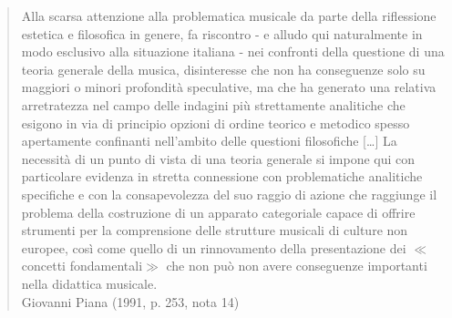 \begin{multicols}{2}
\begin{quote}
	Alla scarsa attenzione alla problematica musicale da parte della riflessione estetica e filosofica in genere, fa riscontro - e alludo qui naturalmente in modo esclusivo alla situazione italiana - nei confronti della questione di una teoria generale della musica, disinteresse che non ha conseguenze solo su maggiori o minori profondità speculative, ma che ha generato una relativa arretratezza nel campo delle indagini più strettamente analitiche che esigono in via di principio opzioni di ordine teorico e metodico spesso apertamente confinanti nell'ambito delle questioni filosofiche [\ldots] La necessità di un punto di vista di una teoria generale si impone qui con particolare evidenza in stretta connessione con problematiche analitiche specifiche e con la consapevolezza del suo raggio di azione che raggiunge il problema della costruzione di un apparato categoriale capace di offrire strumenti per la comprensione delle strutture musicali di culture non europee, così come quello di un  rinnovamento della presentazione dei $\ll$concetti fondamentali$\gg$ che non può non avere conseguenze importanti nella didattica musicale. \\ Giovanni Piana (1991, p. 253, nota 14)
\end{quote}



\end{multicols}
